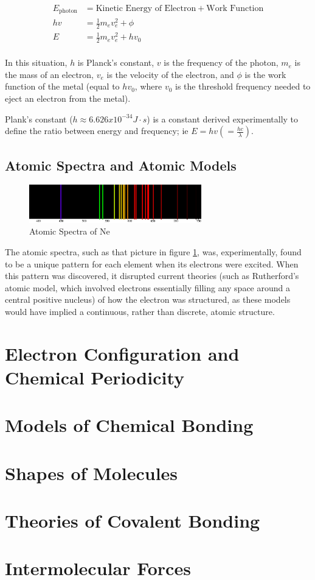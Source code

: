 \documentclass[12pt]{article}
\begin{document}
    \begin{equation}
        \begin{split}
        E_{\text{photon}} &= \text{Kinetic Energy of Electron} + \text{Work Function}\\
        hv &= \frac{1}{2}m_e v_e^2 + \phi\\
        E &= \frac{1}{2}m_e v_e^2 + hv_0\\
        \end{split}
    \end{equation}

In this situation, $h$ is Planck's constant, $v$ is the frequency of the photon, $m_e$ is the mass of an electron, $v_e$ is the velocity of the electron, and $\phi$ is the work function of the metal (equal to $hv_0$, where $v_0$ is the threshold frequency needed to eject an electron from the metal).

Plank's constant ($h\approx 6.626x10^{-34} J \cdot s$) is a constant derived experimentally to define the ratio between energy and frequency; ie $E = hv (=\frac{hc}{\lambda})$.

\subsection{Atomic Spectra and Atomic Models}

\begin{figure}[!ht]
    \centering
    \includegraphics[width=7.5cm]{misc/neonatomicspectra.png}
    \caption{Atomic Spectra of Ne}
    \label{fig:atomicspectra}
\end{figure}

The atomic spectra, such as that picture in figure \ref*{fig:atomicspectra}, was, experimentally, found to be a unique pattern for each element when its electrons were excited. When this pattern was discovered, it disrupted current theories (such as Rutherford's atomic model, which involved electrons essentially filling any space around a central positive nucleus) of how the electron was structured, as these models would have implied a continuous, rather than discrete, atomic structure. 


\section{Electron Configuration and Chemical Periodicity}

\section{Models of Chemical Bonding}

\section{Shapes of Molecules}

\section{Theories of Covalent Bonding}

\section{Intermolecular Forces}
\end{document}
